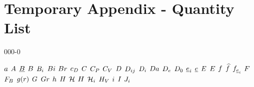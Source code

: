 \section{Temporary Appendix - Quantity List}

\begin{mitframe}{000-0}

$\activity$ \newline
$\helmholtz$ \newline 
$\magind$ \newline
$\exergy$ \newline
$\virialcoeff{i}$ \newline  
$\biot$ \newline
$\brinkman$ \newline
$\dragcoeff$ \newline
$\conc$ \newline
$\cp$ \newline
$\cv$ \newline
$\elecdisplace$ \newline
$\diff$ \newline
$\pdiff$ \newline
$\damkohler$ \newline
$\eneatom$ \newline
$\mbde$ \newline
$\uv$ \newline
$\mcef$ \newline
$\elecfield$ \newline
$\energy$ \newline
$\fug$ \newline
$\mixfug$ \newline
$\dforce$ \newline
$\force$ \newline
$\bodyforce$ \newline
$\raddist$ \newline
$\gibbs$ \newline
$\grashof$ \newline
$\heattranscoeff$ \newline
$\magfield$ \newline
$\surfcurv$ \newline
$\enthalpy$ \newline
$\henry$ \newline
$\energysource$ \newline
$\currentdensity$ \newline
$\mominertia$ \newline
$\molspecflux$ \newline

\end{mitframe}
